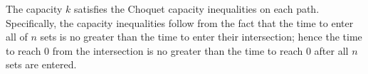 The capacity $k$ satisfies the Choquet capacity inequalities on each path. Specifically, the capacity inequalities follow from the fact that the time to enter all of $n$ sets is no greater than the time to enter their intersection; hence the time to reach $0$ from the intersection is no greater than the time to reach $0$ after all $n$ sets are entered.
